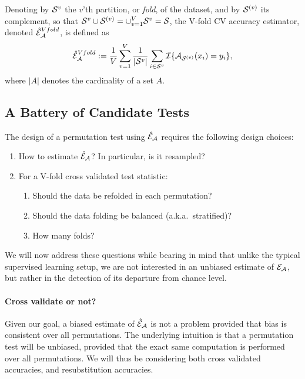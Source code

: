 \documentclass[12pt,a4paper]{article}
\begin{document}
\begin{definition}
\label{def:v-fold}
Denoting by $\mathcal{S}^{v}$ the $v$'th partition, or \emph{fold}, of the dataset, and by $\mathcal{S}^{(v)}$ its complement, so that $\mathcal{S}^{v} \cup \mathcal{S}^{(v)}=\cup_{v=1}^V \mathcal{S}^{v}=\mathcal{S}$, the V-fold CV accuracy estimator, denoted $\hat{\mathcal{E}}_{\mathcal{A}}^{Vfold}$, is defined as 	
\begin{align}
	\hat{\mathcal{E}}_{\mathcal{A}}^{Vfold} := 
	\frac 1V \sum_{v=1}^{V} \frac{1}{|\mathcal{S}^v|} \sum_{i \in \mathcal{S}^{v}} \mathcal{I}{\{ \mathcal{A}_{\mathcal{S}^{(v)}}(x_i)=y_i \}},
\end{align}
where $|A|$ denotes the cardinality of a set $A$.
\end{definition}




\subsection{A Battery of Candidate Tests}
\label{sec:considerations}

The design of a permutation test using $\hat{\mathcal{E}}_{\mathcal{A}}$ requires the following design choices: 
\begin{enumerate}
\item How to estimate $\hat{\mathcal{E}}_{\mathcal{A}}$? In particular, is it resampled?
\item For a V-fold cross validated test statistic:
\begin{enumerate}
\item Should the data be refolded in each permutation? 
\item Should the data folding be balanced (a.k.a.\ stratified)?
\item How many folds? 
\end{enumerate}
\end{enumerate}

We will now address these questions while bearing in mind that unlike the typical supervised learning setup, we are not interested in an unbiased estimate of $\mathcal{E}_{\mathcal{A}}$, but rather in the detection of its departure from chance level. 

\paragraph{Cross validate or not?}
Given our goal, a biased estimate of $\hat{\mathcal{E}}_{\mathcal{A}}$ is not a problem provided that bias is consistent over all permutations. 
The underlying intuition is that a permutation test will be unbiased, provided that the exact same computation is performed over all permutations. 
We will thus be considering both cross validated accuracies, and resubstitution accuracies.
\end{document}
